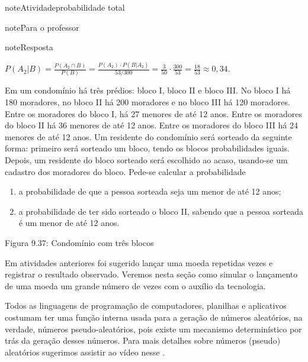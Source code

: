 \begin{sphinxadmonition}{note}{Atividade}{probabilidade total}
\begin{sphinxadmonition}{note}{Para o professor}
\begin{sphinxadmonition}{note}{Resposta}
\begin{enumerate}
\end{enumerate}

\(P(A_2|B)=\frac{P(A_2\cap B)}{P(B)}=\frac{P(A_2)\cdot P(B|A_2)}{53/300}=\frac{3}{50}\cdot\frac{300}{53}=\frac{18}{53}\approx 0,34\).
\end{sphinxadmonition}
\end{sphinxadmonition}

Em um condomínio há três prédios: bloco I, bloco II e bloco III. No bloco I há 180 moradores, no bloco II há 200 moradores e no bloco III há 120 moradores. Entre os moradores do bloco I, há 27 menores de até 12 anos. Entre os moradores do bloco II há 36 menores de até 12 anos. Entre os moradores do bloco III há 24 menores de até 12 anos. Um residente do condomínio será sorteado da seguinte forma: primeiro será sorteado um bloco, tendo os blocos probabilidades iguais.  Depois, um residente do bloco sorteado será escolhido ao acaso, usando-se um cadastro dos moradores do bloco. Pede-se calcular a probabilidade
\begin{enumerate}
\item {} 
a probabilidade de que a pessoa sorteada seja um menor de até 12 anos;

\item {} 
a probabilidade de ter sido sorteado o bloco II, sabendo que a pessoa sorteada é um menor de até 12 anos.

\end{enumerate}
\label{\detokenize{PE511-8:id3}}
\begin{figure}[H]
\centering

\noindent{}
\label{\detokenize{PE511-8:id3}}\end{figure}

Figura 9.37: Condomínio com três blocos
\end{sphinxadmonition}


\know{ }
\label{\detokenize{PE511-A::doc}}\label{\detokenize{PE511-A:para-saber-mais}}
Em atividades anteriores foi sugerido lançar uma moeda repetidas vezes e registrar o resultado observado.  Veremos nesta seção como simular o lançamento de uma moeda um grande número de vezes com o auxílio da tecnologia.

Todos as linguagens de programação de computadores, planilhas e aplicativos costumam ter uma função interna usada para a geração de números aleatórios, na verdade, números pseudo-aleatórios, pois existe um mecanismo determinístico por trás da geração desses números.  Para mais detalhes sobre números (pseudo) aleatórios sugerimos assistir ao vídeo nesse  .

